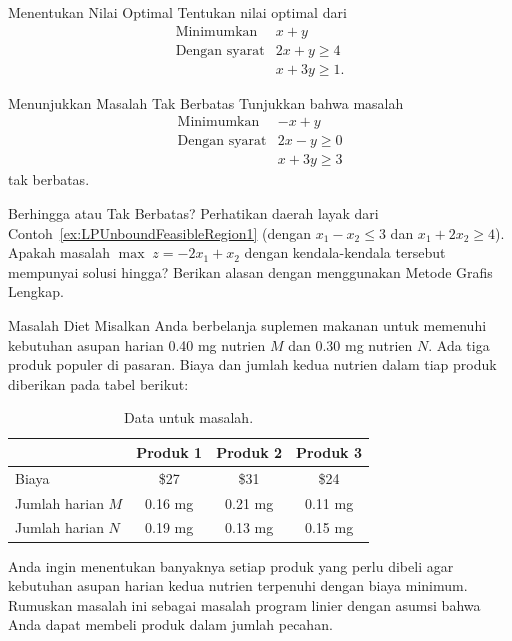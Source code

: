 \begin{ex}{Menentukan Nilai Optimal}{}\label{ex:lp-optimal-value}
Tentukan nilai optimal dari
\[
\begin{array}{rl}
\text{Minimumkan} & x + y \\
\text{Dengan syarat} &  2x + y \geq 4 \\
& x + 3y \geq 1.
\end{array}
\]
\exrefs{\S\ref{sec:graphical-approach}}
\end{ex}

\begin{ex}{Menunjukkan Masalah Tak Berbatas}{}\label{ex:lp-unbounded}
Tunjukkan bahwa masalah
\[
\begin{array}{rl}
\text{Minimumkan} & -x + y \\
\text{Dengan syarat} &  2x - y \geq 0 \\
& x + 3y \geq 3
\end{array}
\]
tak berbatas.
\end{ex}

\begin{ex}{Berhingga atau Tak Berbatas?}{}\label{exer:BoundedSolutionQuestion}
Perhatikan daerah layak dari Contoh~\ref{ex:LPUnboundFeasibleRegion1} (dengan $x_1-x_2\leq 3$ dan $x_1+2x_2\geq 4$). Apakah masalah $\max\; z = -2x_1 + x_2$ dengan kendala-kendala tersebut mempunyai solusi hingga? Berikan alasan dengan menggunakan Metode Grafis Lengkap.
\end{ex}

\begin{ex}{Masalah Diet}{}\label{ex:lp-diet-problem}
Misalkan Anda berbelanja suplemen makanan untuk memenuhi
kebutuhan asupan harian 0.40 mg nutrien \(M\) dan 0.30 mg
nutrien \(N\). Ada tiga produk populer di pasaran. Biaya dan jumlah
kedua nutrien dalam tiap produk diberikan pada tabel berikut:

\begin{table}[h!]
\centering
\begin{tabular}{lccc}
\toprule
         & Produk 1 & Produk 2 & Produk 3 \\ \midrule
Biaya     & \$27      & \$31      & \$24      \\
Jumlah harian \(M\) & 0.16 mg   & 0.21 mg   & 0.11 mg   \\
Jumlah harian \(N\) & 0.19 mg   & 0.13 mg   & 0.15 mg   \\ \bottomrule
\end{tabular}
\caption{Data untuk masalah.}
\label{tab:your_table_label}
\end{table}

Anda ingin menentukan banyaknya setiap produk yang perlu dibeli agar
kebutuhan asupan harian kedua nutrien terpenuhi dengan biaya minimum.
Rumuskan masalah ini sebagai masalah program linier dengan asumsi bahwa
Anda dapat membeli produk dalam jumlah pecahan.
\end{ex}

